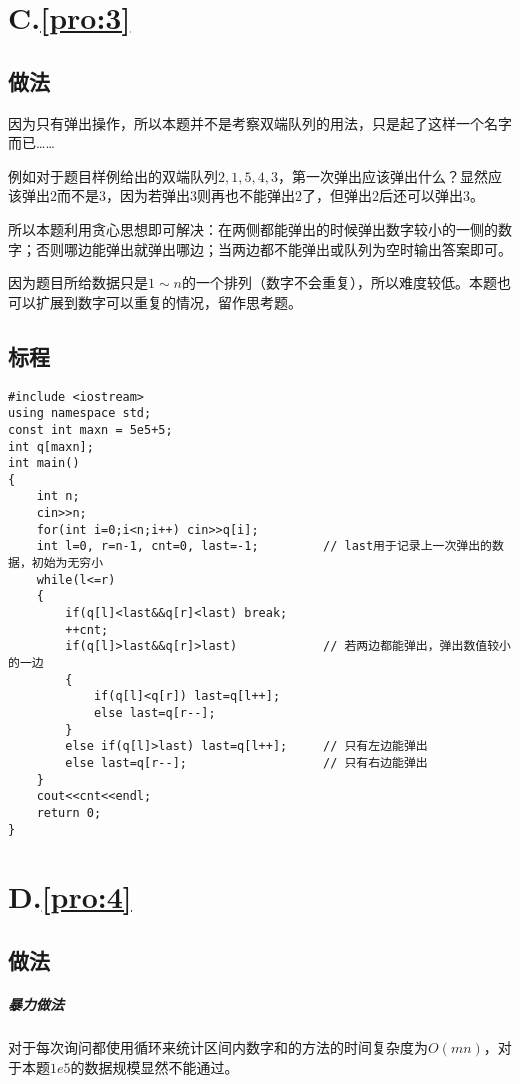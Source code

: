 \documentclass[
	lang=cn,
	color=blue
]{elegantbook}
\begin{document}
\chapter*{C.\quad \ref*{pro:3}}
\section*{做法}
因为只有弹出操作，所以本题并不是考察双端队列的用法，只是起了这样一个名字而已……

例如对于题目样例给出的双端队列$2,1,5,4,3$，第一次弹出应该弹出什么？显然应该弹出$2$而不是$3$，因为若弹出3则再也不能弹出$2$了，但弹出$2$后还可以弹出$3$。

所以本题利用贪心思想即可解决：在两侧都能弹出的时候弹出数字较小的一侧的数字；否则哪边能弹出就弹出哪边；当两边都不能弹出或队列为空时输出答案即可。

因为题目所给数据只是$1 \sim n$的一个排列（数字不会重复），所以难度较低。本题也可以扩展到数字可以重复的情况，留作思考题。

\section*{标程}
\begin{lstlisting}
#include <iostream>
using namespace std;
const int maxn = 5e5+5;
int q[maxn];
int main()
{
    int n;
    cin>>n;
    for(int i=0;i<n;i++) cin>>q[i];
    int l=0, r=n-1, cnt=0, last=-1;         // last用于记录上一次弹出的数据，初始为无穷小
    while(l<=r)
    {
        if(q[l]<last&&q[r]<last) break;
        ++cnt;
        if(q[l]>last&&q[r]>last)            // 若两边都能弹出，弹出数值较小的一边
        {
            if(q[l]<q[r]) last=q[l++];
            else last=q[r--];
        }
        else if(q[l]>last) last=q[l++];     // 只有左边能弹出
        else last=q[r--];                   // 只有右边能弹出
    }
    cout<<cnt<<endl;
    return 0;
}
\end{lstlisting}

\chapter*{D.\quad \ref*{pro:4}}
\section*{做法}
\paragraph*{暴力做法} 对于每次询问都使用循环来统计区间内数字和的方法的时间复杂度为$O(mn)$，对于本题$1e5$的数据规模显然不能通过。
\end{document}
